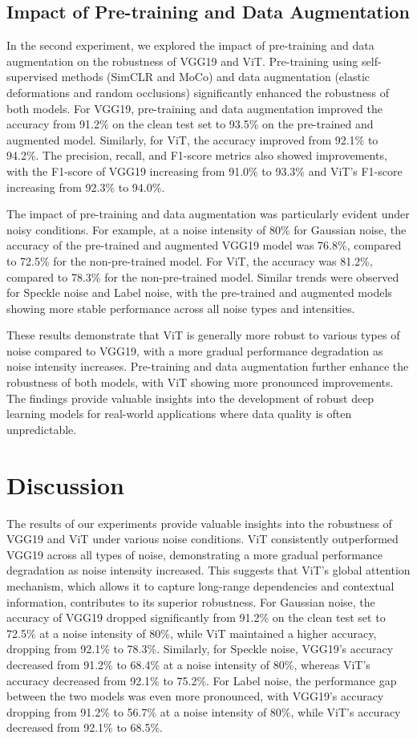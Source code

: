 \documentclass{article}
\begin{document}
\subsection{Impact of Pre-training and Data Augmentation}
In the second experiment, we explored the impact of pre-training and data augmentation on the robustness of VGG19 and ViT. Pre-training using self-supervised methods (SimCLR and MoCo) and data augmentation (elastic deformations and random occlusions) significantly enhanced the robustness of both models. For VGG19, pre-training and data augmentation improved the accuracy from 91.2\% on the clean test set to 93.5\% on the pre-trained and augmented model. Similarly, for ViT, the accuracy improved from 92.1\% to 94.2\%. The precision, recall, and F1-score metrics also showed improvements, with the F1-score of VGG19 increasing from 91.0\% to 93.3\% and ViT's F1-score increasing from 92.3\% to 94.0\%.

The impact of pre-training and data augmentation was particularly evident under noisy conditions. For example, at a noise intensity of 80\% for Gaussian noise, the accuracy of the pre-trained and augmented VGG19 model was 76.8\%, compared to 72.5\% for the non-pre-trained model. For ViT, the accuracy was 81.2\%, compared to 78.3\% for the non-pre-trained model. Similar trends were observed for Speckle noise and Label noise, with the pre-trained and augmented models showing more stable performance across all noise types and intensities.

These results demonstrate that ViT is generally more robust to various types of noise compared to VGG19, with a more gradual performance degradation as noise intensity increases. Pre-training and data augmentation further enhance the robustness of both models, with ViT showing more pronounced improvements. The findings provide valuable insights into the development of robust deep learning models for real-world applications where data quality is often unpredictable.

\section{Discussion}
The results of our experiments provide valuable insights into the robustness of VGG19 and ViT under various noise conditions. ViT consistently outperformed VGG19 across all types of noise, demonstrating a more gradual performance degradation as noise intensity increased. This suggests that ViT's global attention mechanism, which allows it to capture long-range dependencies and contextual information, contributes to its superior robustness. For Gaussian noise, the accuracy of VGG19 dropped significantly from 91.2\% on the clean test set to 72.5\% at a noise intensity of 80\%, while ViT maintained a higher accuracy, dropping from 92.1\% to 78.3\%. Similarly, for Speckle noise, VGG19's accuracy decreased from 91.2\% to 68.4\% at a noise intensity of 80\%, whereas ViT's accuracy decreased from 92.1\% to 75.2\%. For Label noise, the performance gap between the two models was even more pronounced, with VGG19's accuracy dropping from 91.2\% to 56.7\% at a noise intensity of 80\%, while ViT's accuracy decreased from 92.1\% to 68.5\%.
\end{document}

